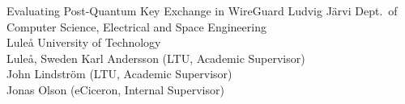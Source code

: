 \documentclass[12pt,a4paper,openright,final,twoside]{Essential/cseethesis}
\begin{document}
\def\thesistitle{Evaluating Post-Quantum Key Exchange in WireGuard }

\def\theauthor{Ludvig Järvi}
\def\theaddress{Dept.\ of Computer Science, Electrical and Space Engineering\\
Lule{\aa} University of Technology\\ Lule{\aa}, Sweden}

\def\supervisors{    Karl Andersson (LTU, Academic Supervisor) \\
    John Lindström (LTU, Academic Supervisor) \\
    Jonas Olson (eCiceron, Internal Supervisor)}
\def\supervisorstring{Supervisors:} %

\def\theabstract{}
\def\thepreface{}



\startpreamble
  {\thesistitle}
  {\theauthor}
  {\theaddress}
  {\supervisors}
  {\thepreface} 
  {\theabstract}

\startchapters
\pagestyle{fancy}

\makeacronyms{}

















\printbibliography
\end{document}
